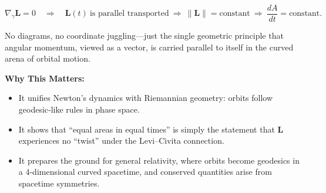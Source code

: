 \[
\boxed{\nabla_{\dot\gamma}\mathbf L = 0}
\quad\Longrightarrow\quad
\mathbf L(t)\ \text{is parallel transported}\ 
\Longrightarrow\ 
\|\mathbf L\|=\text{constant}
\ \Longrightarrow\ 
\frac{dA}{dt}=\text{constant}.
\]

No diagrams, no coordinate juggling—just the single geometric principle that angular momentum, viewed as a vector, is carried parallel to itself in the curved arena of orbital motion.

\bigskip
\noindent\textbf{Why This Matters:}
\begin{itemize}
  \item It unifies Newton’s dynamics with Riemannian geometry: orbits follow geodesic‐like rules in phase space.  
  \item It shows that “equal areas in equal times” is simply the statement that \(\mathbf L\) experiences no “twist” under the Levi–Civita connection.  
  \item It prepares the ground for general relativity, where orbits become geodesics in a 4-dimensional curved spacetime, and conserved quantities arise from spacetime symmetries.
\end{itemize}
